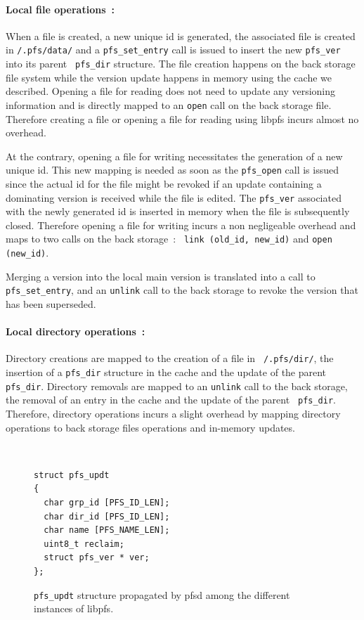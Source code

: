 \paragraph{Local file operations~:}
When a file is created, a new unique id is generated, the associated
file is created in {\tt /.pfs/data/} and a {\tt pfs\_set\_entry} call
is issued to insert the new {\tt pfs\_ver} into its parent {\tt
  pfs\_dir} structure. The file creation happens on the back storage
file system while the version update happens in memory using the cache
we described. Opening a file for reading does not need to update any
versioning information and is directly mapped to an {\tt open} call on
the back storage file. Therefore creating a file or opening a file for
reading using libpfs incurs almost no overhead.

At the contrary, opening a file for writing necessitates the
generation of a new unique id. This new mapping is needed as soon as
the {\tt pfs\_open} call is issued since the actual id for the file
might be revoked if an update containing a dominating version is
received while the file is edited. The {\tt pfs\_ver} associated with
the newly generated id is inserted in memory when the file is
subsequently closed. Therefore opening a file for writing incurs a non
negligeable overhead and maps to two calls on the back storage~: {\tt
  link (old\_id, new\_id)} and {\tt open (new\_id)}.

Merging a version into the local main version is translated into a
call to {\tt pfs\_set\_entry}, and an {\tt unlink} call to the back
storage to revoke the version that has been superseded.

\paragraph{Local directory operations~:}
Directory creations are mapped to the creation of a file in {\tt
  /.pfs/dir/}, the insertion of a {\tt pfs\_dir} structure in the
cache and the update of the parent {\tt pfs\_dir}. Directory removals
are mapped to an {\tt unlink} call to the back storage, the removal of
an entry in the cache and the update of the parent {\tt
  pfs\_dir}. Therefore, directory operations incurs a slight overhead
by mapping directory operations to back storage files operations and
in-memory updates.

\begin{figure}[ht]
\begin{center}
{\tt \small
\begin{verbatim}
struct pfs_updt
{
  char grp_id [PFS_ID_LEN];
  char dir_id [PFS_ID_LEN];  
  char name [PFS_NAME_LEN];
  uint8_t reclaim;
  struct pfs_ver * ver;
};
\end{verbatim}
}
\end{center}
\caption{\label{PfsUpdt}
{\small {\tt pfs\_updt} structure propagated by pfsd among the
    different instances of libpfs.}}
\end{figure}

